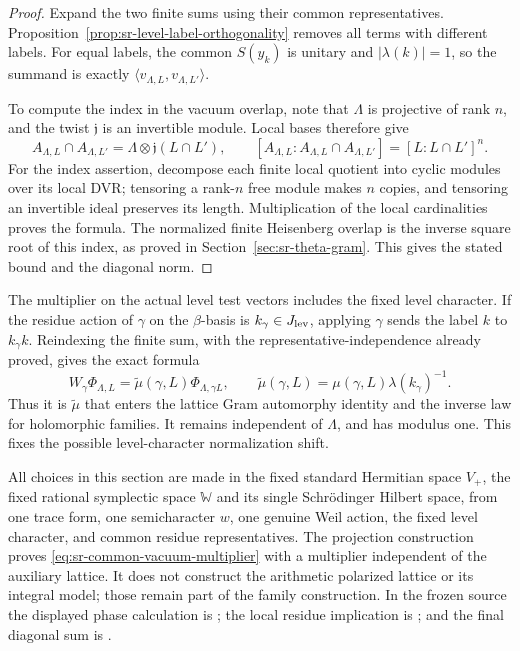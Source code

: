 \begin{proof}
Expand the two finite sums using their common representatives.
Proposition~\ref{prop:sr-level-label-orthogonality} removes all
terms with different labels.
For equal labels, the common \(S(y_k)\) is unitary and
\(|\lambda(k)|=1\), so the summand is exactly
\(\langle v_{\Lambda,L},v_{\Lambda,L'}\rangle\).

To compute the index in the vacuum overlap, note that
\(\Lambda\) is projective of rank \(n\), and the twist
\(\mathfrak j\) is an invertible module.
Local bases therefore give
\[
 A_{\Lambda,L}\cap A_{\Lambda,L'}
       =\Lambda\otimes\mathfrak j(L\cap L'),\qquad
 [A_{\Lambda,L}:A_{\Lambda,L}\cap A_{\Lambda,L'}]
       =[L:L\cap L']^n.
\]
For the index assertion, decompose each finite local quotient
into cyclic modules over its local DVR; tensoring a rank-\(n\)
free module makes \(n\) copies, and tensoring an invertible
ideal preserves its length.  Multiplication of the local
cardinalities proves the formula.
The normalized finite Heisenberg overlap is the inverse
square root of this index, as proved in
Section~\ref{sec:sr-theta-gram}.
This gives the stated bound and the diagonal norm.
\end{proof}

The multiplier on the actual level test vectors includes the fixed
level character.  If the residue action of \(\gamma\) on the
\(\beta\)-basis is \(k_\gamma\in J_{\rm lev}\), applying
\(\gamma\) sends the label \(k\) to \(k_\gamma k\).
Reindexing the finite sum, with the representative-independence
already proved, gives the exact formula
\[
 W_\gamma\Phi_{\Lambda,L}
   =\widetilde\mu(\gamma,L)\Phi_{\Lambda,\gamma L},
 \qquad
 \widetilde\mu(\gamma,L)
       =\mu(\gamma,L)\lambda(k_\gamma)^{-1}.
\]
Thus it is \(\widetilde\mu\) that enters the lattice Gram
automorphy identity and the inverse law for holomorphic families.
It remains independent of \(\Lambda\), and has modulus one.
This fixes the possible level-character normalization shift.

All choices in this section are made in the fixed standard
Hermitian space \(V_+\), the fixed rational symplectic space
\(\mathbb W\) and its single Schr\"odinger Hilbert space, from
one trace form, one semicharacter \(w\), one genuine Weil action,
the fixed level character, and common residue representatives.
The projection construction proves
\eqref{eq:sr-common-vacuum-multiplier} with a multiplier
independent of the auxiliary lattice.
It does not construct the arithmetic polarized lattice or its
integral model; those remain part of the family construction.
In the frozen source the displayed phase calculation is
;
the local residue implication is ;
and the final diagonal sum is .


